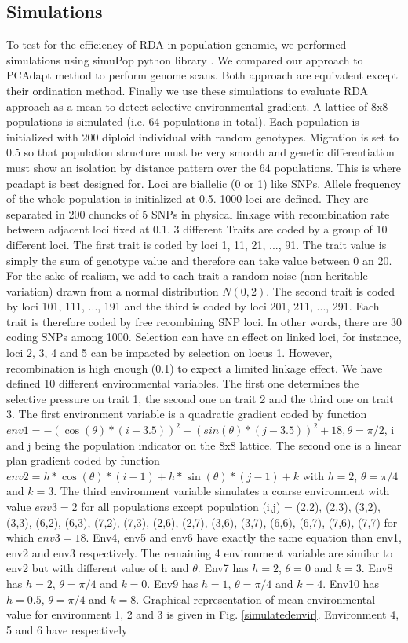 \documentclass[nogrid]{MBE}%
\begin{document}
\subsection{Simulations}

To test for the efficiency of RDA in population genomic, we performed simulations using simuPop python library \citep{Peng2005}. We compared our approach to PCAdapt method to perform genome scans. Both approach are equivalent except their ordination method. Finally we use these simulations to evaluate RDA approach as a mean to detect selective environmental gradient.
	A lattice of 8x8 populations is simulated (i.e. 64 populations in total). Each population is initialized with 200 diploid individual with random genotypes. Migration is set to 0.5 so that population structure must be very smooth and genetic differentiation must show an isolation by distance pattern over the 64 populations. This is where pcadapt is best designed for. Loci are biallelic (0 or 1) like SNPs. Allele frequency of the whole population is initialized at 0.5. 1000 loci are defined. They are separated in 200 chuncks of 5 SNPs in physical linkage with recombination rate between adjacent loci fixed at 0.1. 3 different Traits are coded by a group of 10 different loci. The first trait is coded by loci 1, 11, 21, ..., 91. The trait value is simply the sum of genotype value and therefore can take value between 0 an 20. For the sake of realism, we add to each trait a random noise (non heritable variation) drawn from a normal distribution $N(0,2)$. The second trait is coded by loci 101, 111, ..., 191 and the third is coded by loci 201, 211, ..., 291. Each trait is therefore coded by free recombining SNP loci. In other words, there are 30 coding SNPs among 1000. Selection can have an effect on linked loci, for instance, loci 2, 3, 4 and 5 can be impacted by selection on locus 1. However, recombination is high enough (0.1) to expect a limited linkage effect. We have defined 10 different environmental variables. The first one determines the selective pressure on trait 1, the second one on trait 2 and the third one on trait 3. The first environment variable is a quadratic gradient coded by function  $env1 = -(\cos(\theta)*(i-3.5))^2 -(sin(\theta)*(j-3.5))^2 + 18, \theta = \pi/2$, i and j being the population indicator on the 8x8 lattice. The second one is a linear plan gradient coded by function $env2 = h*\cos(\theta)*(i-1) + h*\sin(\theta)*(j-1) + k$ with $h=2$, $\theta = \pi/4$ and $k=3$. The third environment variable simulates a coarse environment with value $env3 = 2$ for all populations except population (i,j) = {(2,2), (2,3), (3,2), (3,3), (6,2), (6,3), (7,2), (7,3), (2,6), (2,7), (3,6), (3,7), (6,6), (6,7), (7,6), (7,7)} for which $env3 = 18$. Env4, env5 and env6 have exactly the same equation than env1, env2 and env3 respectively. The remaining 4 environment variable are similar to env2 but with different value of h and $\theta$. Env7 has $h=2$, $\theta = 0$ and $k=3$. Env8 has $h=2$, $\theta = \pi/4$ and $k=0$. Env9 has $h=1$, $\theta = \pi/4$ and $k=4$. Env10 has $h=0.5$, $\theta = \pi/4$ and $k=8$. Graphical representation of mean environmental value for environment 1, 2 and 3 is given in Fig. \ref{simulatedenvir}. Environment 4, 5 and 6 have respectively 
\end{document}
